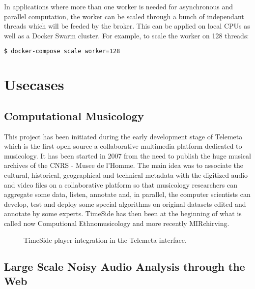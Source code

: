 \documentclass{article}
\begin{document}
In applications where more than one worker is needed for asynchronous and parallel computation, the worker can be scaled through a bunch of independant threads which will be feeded by the broker. This can be applied on local CPUs as well as a Docker Swarm cluster. For example, to scale the worker on 128 threads:\newline

\verb|$ docker-compose scale worker=128|


\section{Usecases}

\subsection{Computational Musicology}

This project has been initiated during the early development stage of Telemeta\cite{telemeta} which is the first open source a collaborative multimedia platform dedicated to musicology. It has been started in 2007 from the need to publish the huge musical archives of the CNRS - Musee de l'Homme\cite{telemetaCREM}. The main idea was to associate the cultural, historical, geographical and technical metadata with the digitized audio and video files on a collaborative platform so that musicology researchers can aggregate some data, listen, annotate and, in parallel, the computer scientists can develop, test and deploy some special algorithms on original datasets edited and annotate by some experts. TimeSide has then been at the beginning of what is called now Computional Ethnomusicology\cite{Tzanetakis_2007_JIMS}\cite{Simmonot_IASA_2011}\cite{Julien_IASA_2011}\cite{Simonnot_ICTM_2014}\cite{Pellerin_AES_2014} and more recently MIRchirving. 


\begin{figure}
 \centerline{}
 \caption{TimeSide player integration in the Telemeta interface.}
 \label{fig:telemeta}
\end{figure}


\subsection{Large Scale Noisy Audio Analysis through the Web}
\end{document}
